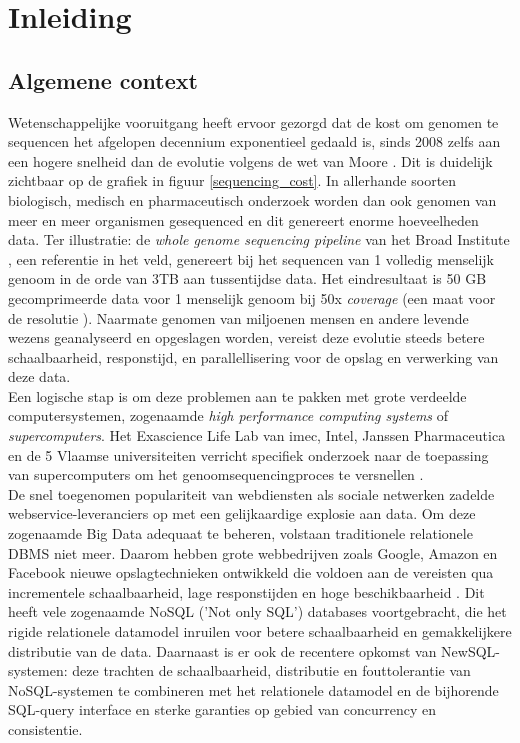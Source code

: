 \chapter{Inleiding}
\label{inleiding}

\section{Algemene context}

Wetenschappelijke vooruitgang heeft ervoor gezorgd dat de kost om genomen te sequencen het afgelopen decennium exponentieel gedaald is, sinds 2008 zelfs aan een hogere snelheid dan de evolutie volgens de wet van Moore \cite{wetterstrand_sequencing_cost}. Dit is duidelijk zichtbaar op de grafiek in figuur \ref{sequencing_cost}. In allerhande soorten biologisch, medisch en pharmaceutisch onderzoek worden dan ook genomen van meer en meer organismen gesequenced en dit genereert enorme hoeveelheden data. Ter illustratie: de \textit{whole genome sequencing pipeline} van het Broad Institute \cite{broad_institute}, een referentie in het veld, genereert bij het sequencen van 1 volledig menselijk genoom in de orde van 3TB aan tussentijdse data. Het eindresultaat is 50 GB gecomprimeerde data voor 1 menselijk genoom bij 50x \textit{coverage} (een maat voor de resolutie \cite{coverage_definition}). Naarmate genomen van miljoenen mensen en andere levende wezens geanalyseerd en opgeslagen worden, vereist deze evolutie steeds betere schaalbaarheid, responstijd, en parallellisering voor de opslag en verwerking van deze data.\\

Een logische stap is om deze problemen aan te pakken met grote verdeelde computersystemen, zogenaamde \textit{high performance computing systems} of \textit{supercomputers}. Het Exascience Life Lab van imec, Intel, Janssen Pharmaceutica en de 5 Vlaamse universiteiten verricht specifiek onderzoek naar de toepassing van supercomputers om het genoomsequencingproces te versnellen \cite{lifelab_bwa}\cite{exascience_life_lab}.\\
De snel toegenomen populariteit van webdiensten als sociale netwerken zadelde webservice-leveranciers op met een gelijkaardige explosie aan data. Om deze zogenaamde Big Data \cite{mashey1997big} adequaat te beheren, volstaan traditionele relationele DBMS niet meer. Daarom hebben grote webbedrijven zoals Google, Amazon en Facebook nieuwe opslagtechnieken ontwikkeld die voldoen aan de vereisten qua incrementele schaalbaarheid, lage responstijden en hoge beschikbaarheid \cite{baker2011megastore}. Dit heeft vele zogenaamde NoSQL ('Not only SQL') databases voortgebracht, die het rigide relationele datamodel inruilen voor betere schaalbaarheid en gemakkelijkere distributie van de data. Daarnaast is er ook de recentere opkomst van NewSQL-systemen: deze trachten de schaalbaarheid, distributie en fouttolerantie van NoSQL-systemen te combineren met het relationele datamodel en de bijhorende SQL-query interface en sterke garanties op gebied van concurrency en consistentie.

